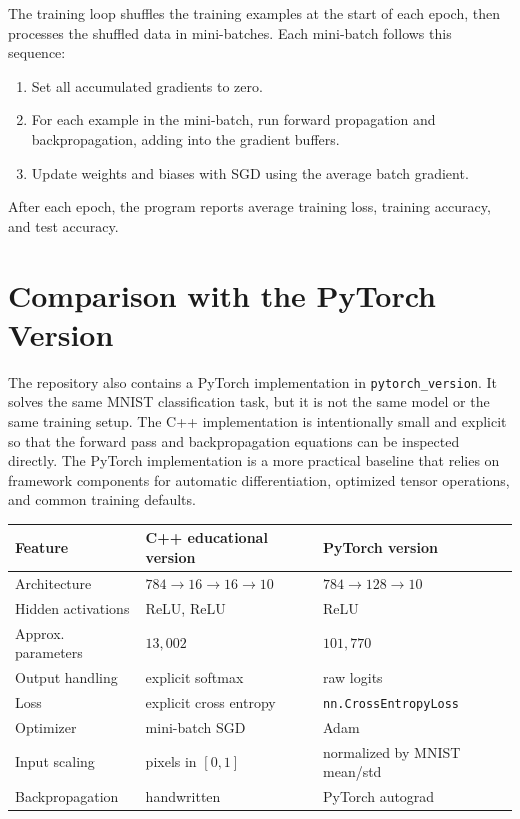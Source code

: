 \documentclass[11pt]{article}
\begin{document}
The training loop shuffles the training examples at the start of each epoch,
then processes the shuffled data in mini-batches. Each mini-batch follows this
sequence:

\begin{enumerate}[label=\arabic*.]
    \item Set all accumulated gradients to zero.
    \item For each example in the mini-batch, run forward propagation and
          backpropagation, adding into the gradient buffers.
    \item Update weights and biases with SGD using the average batch gradient.
\end{enumerate}

After each epoch, the program reports average training loss, training accuracy,
and test accuracy.


\section{Comparison with the PyTorch Version}

The repository also contains a PyTorch implementation in \texttt{pytorch\_version}.
It solves the same MNIST classification task, but it is not the same model or the
same training setup. The C++ implementation is intentionally small and explicit
so that the forward pass and backpropagation equations can be inspected directly.
The PyTorch implementation is a more practical baseline that relies on framework
components for automatic differentiation, optimized tensor operations, and common
training defaults.

\begin{center}
\begin{tabular}{lll}
\toprule
Feature & C++ educational version & PyTorch version \\
\midrule
Architecture & $784 \to 16 \to 16 \to 10$ & $784 \to 128 \to 10$ \\
Hidden activations & ReLU, ReLU & ReLU \\
Approx. parameters & $13{,}002$ & $101{,}770$ \\
Output handling & explicit softmax & raw logits \\
Loss & explicit cross entropy & \texttt{nn.CrossEntropyLoss} \\
Optimizer & mini-batch SGD & Adam \\
Input scaling & pixels in $[0,1]$ & normalized by MNIST mean/std \\
Backpropagation & handwritten & PyTorch autograd \\
\bottomrule
\end{tabular}
\end{center}
\end{document}
